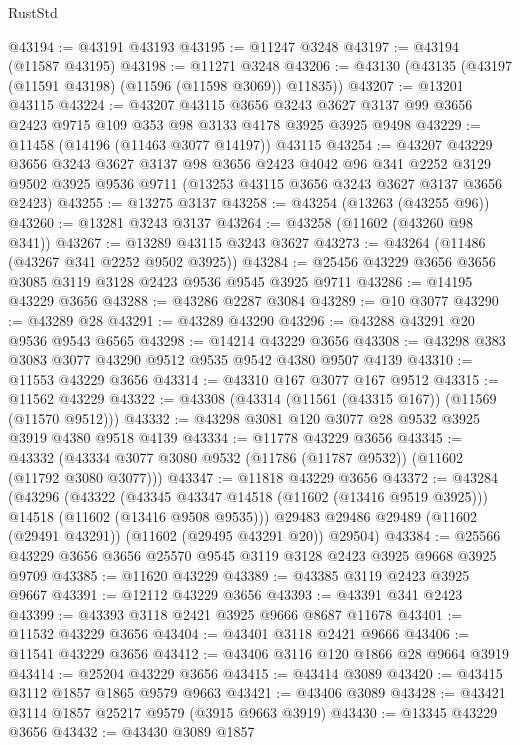 \begin{lexlean}{RustStd}
\begin{coremodule}
@43194 := @43191 @43193
@43195 := @11247 @3248
@43197 := @43194 (@11587 @43195)
@43198 := @11271 @3248
@43206 := @43130 (@43135 (@43197 (@11591 @43198) (@11596 (@11598 @3069)) @11835))
@43207 := @13201 @43115
@43224 := @43207
    @43115
    @3656
    @3243
    @3627
    @3137
    @99
    @3656
    @2423
    @9715
    @109
    @353
    @98
    @3133
    @4178
    @3925
    @3925
    @9498
@43229 := @11458 (@14196 (@11463 @3077 @14197)) @43115
@43254 := @43207
    @43229
    @3656
    @3243
    @3627
    @3137
    @98
    @3656
    @2423
    @4042
    @96
    @341
    @2252
    @3129
    @9502
    @3925
    @9536
    @9711
    (@13253 @43115 @3656 @3243 @3627 @3137 @3656 @2423)
@43255 := @13275 @3137
@43258 := @43254 (@13263 (@43255 @96))
@43260 := @13281 @3243 @3137
@43264 := @43258 (@11602 (@43260 @98 @341))
@43267 := @13289 @43115 @3243 @3627
@43273 := @43264 (@11486 (@43267 @341 @2252 @9502 @3925))
@43284 := @25456 @43229 @3656 @3656 @3085 @3119 @3128 @2423 @9536 @9545 @3925 @9711
@43286 := @14195 @43229 @3656
@43288 := @43286 @2287 @3084
@43289 := @10 @3077
@43290 := @43289 @28
@43291 := @43289 @43290
@43296 := @43288 @43291 @20 @9536 @9543 @6565
@43298 := @14214 @43229 @3656
@43308 := @43298 @383 @3083 @3077 @43290 @9512 @9535 @9542 @4380 @9507 @4139
@43310 := @11553 @43229 @3656
@43314 := @43310 @167 @3077 @167 @9512
@43315 := @11562 @43229
@43322 := @43308 (@43314 (@11561 (@43315 @167)) (@11569 (@11570 @9512)))
@43332 := @43298 @3081 @120 @3077 @28 @9532 @3925 @3919 @4380 @9518 @4139
@43334 := @11778 @43229 @3656
@43345 := @43332 (@43334 @3077 @3080 @9532 (@11786 (@11787 @9532)) (@11602 (@11792 @3080 @3077)))
@43347 := @11818 @43229 @3656
@43372 := @43284
    (@43296
      (@43322
        (@43345 @43347 @14518 (@11602 (@13416 @9519 @3925)))
        @14518
        (@11602 (@13416 @9508 @9535)))
      @29483
      @29486
      @29489
      (@11602 (@29491 @43291))
      (@11602 (@29495 @43291 @20))
      @29504)
@43384 := @25566 @43229 @3656 @3656 @25570 @9545 @3119 @3128 @2423 @3925 @9668 @3925 @9709
@43385 := @11620 @43229
@43389 := @43385 @3119 @2423 @3925 @9667
@43391 := @12112 @43229 @3656
@43393 := @43391 @341 @2423
@43399 := @43393 @3118 @2421 @3925 @9666 @8687 @11678
@43401 := @11532 @43229 @3656
@43404 := @43401 @3118 @2421 @9666
@43406 := @11541 @43229 @3656
@43412 := @43406 @3116 @120 @1866 @28 @9664 @3919
@43414 := @25204 @43229 @3656
@43415 := @43414 @3089
@43420 := @43415 @3112 @1857 @1865 @9579 @9663
@43421 := @43406 @3089
@43428 := @43421 @3114 @1857 @25217 @9579 (@3915 @9663 @3919)
@43430 := @13345 @43229 @3656
@43432 := @43430 @3089 @1857

\end{coremodule}
\end{lexlean}
